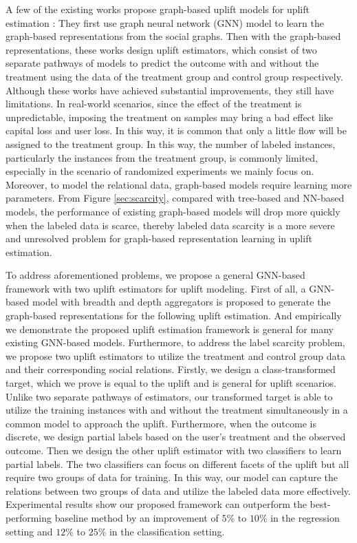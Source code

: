 A few of the existing works propose graph-based uplift models for uplift estimation \cite{veitch2019using,guo2020counterfactual,guo2020learning}: They first use graph neural network (GNN) model to learn the graph-based representations from the social graphs. Then with the graph-based representations, these works design uplift estimators, which consist of two separate pathways of models to predict the outcome with and without the treatment using the data of the treatment group and control group respectively. Although these works have achieved substantial improvements, they still have limitations. In real-world scenarios, since the effect of the treatment is unpredictable, imposing the treatment on samples may bring a bad effect like capital loss and user loss. In this way, it is common that only a little flow will be assigned to the treatment group. In this way,  the number of labeled instances, particularly the instances from the treatment group, is commonly limited, especially in the scenario of randomized experiments we mainly focus on. Moreover, to model the relational data, graph-based models require learning more parameters. From Figure \ref{sec:scarcity}, compared with tree-based and NN-based models, the performance of existing graph-based models will drop more quickly when the labeled data is scarce, thereby labeled data scarcity is a more severe and unresolved problem for graph-based representation learning in uplift estimation. 

To address aforementioned problems, we propose a general GNN-based framework with two uplift estimators for uplift modeling. First of all, a GNN-based model with breadth and depth aggregators is proposed to generate the graph-based representations for the following uplift estimation. And empirically we demonstrate the proposed uplift estimation framework is general for many existing GNN-based models. Furthermore, to address the label scarcity problem, we propose two uplift estimators to utilize the treatment and control group data and their corresponding social relations. Firstly, we design a class-transformed target, which we prove is equal to the uplift and is general for uplift scenarios. Unlike two separate pathways of estimators, our transformed target is able to utilize the training instances with and without the treatment simultaneously in a common model to approach the uplift. Furthermore, when the outcome is discrete, we design partial labels based on the user's treatment and the observed outcome. Then we design the other uplift estimator with two classifiers to learn partial labels. The two classifiers can focus on different facets of the uplift but all require two groups of data for training. In this way, our model can capture the relations between two groups of data and utilize the labeled data more effectively. Experimental results show our proposed framework can outperform the best-performing baseline method by an improvement of $5$\% to $10$\% in the regression setting and $12$\% to $25$\% in the classification setting. 

